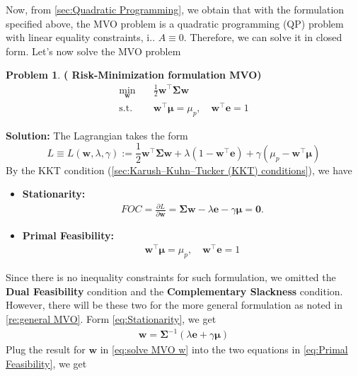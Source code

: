 \documentclass[13pt]{article}
\theoremstyle{definition}
\newtheorem{problem}[theorem]{Problem}
\newenvironment{solution}
{\color{C2}\begin{framed}\begingroup\textbf{Solution:} }
  {\endgroup\end{framed}}
\theoremstyle{remark}
\newenvironment{remark}
  {\pushQED{\qed}\renewcommand{\qedsymbol}{$\triangle$}\remarkx}
  {\popQED\endremarkx}
\begin{document}
Now, from \cref{sec:Quadratic Programming}, we obtain that with the formulation specified above, the MVO problem is a quadratic programming (QP) problem with linear equality constraints, i.. $A \equiv 0$. Therefore, we can solve it in closed form. Let's now solve the MVO problem
\begin{problem}\textbf{( Risk-Minimization
formulation MVO)} \begin{align*}
    \min _{\bm{w}} \quad & \frac{1}{2} \bm{w}^{\top} \mathbf{\Sigma} \bm{w} \\
    \text {s.t.} \quad  & \bm{w}^{\top} \bm{\mu}=\mu_{p}, \quad  
 \bm{w}^{\top} \bm{e}=1
\end{align*}
\end{problem}

\begin{solution}
    The Lagrangian takes the form
$$
L \equiv L(\bm{w}, \lambda, \gamma):=\frac{1}{2} \bm{w}^{\top} \mathbf{\Sigma} \bm{w}+\lambda\left(1-\bm{w}^{\top}\bm{ \bm{e}}\right)+\gamma\left(\mu_{p}-\bm{w}^{\top} \bm{\mu}\right)
$$
By the KKT condition (\cref{sec:Karush–Kuhn–Tucker (KKT) conditions}), we have
\begin{itemize}
    \item \textbf{Stationarity:} \begin{align}
        FOC=\frac{\partial L}{\partial \bm{w}}=\mathbf{\Sigma} \bm{w}-\lambda \bm{e}-\gamma \bm{\mu}=\bm{0}.\label{eq:Stationarity}
    \end{align}
    \item \textbf{Primal Feasibility:}
    \begin{align}
        \bm{w}^{\top} \bm{\mu}=\mu_{p}, \quad \bm{w}^{\top} \bm{e}=1\label{eq:Primal Feasibility}
    \end{align}
\end{itemize}
\begin{remark}
    Since there is no inequality constraints for such formulation, we omitted the \textbf{Dual Feasibility} condition and the \textbf{Complementary Slackness} condition. However, there will be these two for the more general formulation as noted in \cref{re:general MVO}.
\end{remark}
Form \cref{eq:Stationarity}, we get
\begin{align}
     \bm{w}= \mathbf{\Sigma}^{-1}(\lambda \bm{e}+\gamma \bm{\mu}) \label{eq:solve MVO w}
\end{align}
Plug the result for $\bm{w}$ in \cref{eq:solve MVO w} into the two equations in \cref{eq:Primal Feasibility}, we get

\end{solution}
\end{document}
